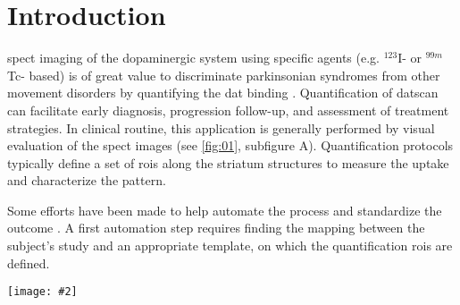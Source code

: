 \documentclass{frontiers}
\newcommand{\insertgraphic}[2]{\texttt{[image: \#2]}}
\newcommand{\fixme}[1]{}
\newcommand{\fixme}[1]{{\color{red}{\bf FIXME: }\emph{#1}}}
\newcommand{\insertgraphic}[2]{\texttt{[image: \#2]}}
\begin{document}

\glsresetall[\acronymtype]

\section{Introduction}
\label{sec:intro}
\fixme{Three sentences here introducing why the evaluation workflows
  are important and why python is good to build them (right?)}

\Gls*{spect} imaging of the dopaminergic system using
  specific agents (e.g. $^{123}$I- or $^{99m}$Tc- based) is of great
  value to discriminate parkinsonian syndromes from other movement
  disorders by quantifying the \acrlong*{dat} binding \citep{bajaj_clinical_2013}.
Quantification of \gls*{datscan} can facilitate early 
  diagnosis, progression follow-up, and assessment of treatment
  strategies. In clinical routine, this application is generally
  performed by visual evaluation of the \gls*{spect} images
  (see \autoref{fig:01}, subfigure A).
Quantification protocols typically define a set of \glspl*{roi} along the
  striatum structures to measure the uptake and characterize the pattern.

Some efforts have been made to help automate the process and standardize
  the outcome \citep{calvini_basal_2007,badiavas_spect_2011}.
A first automation step requires finding the mapping between the subject's
  study and an appropriate template, on which the quantification \glspl*{roi}
  are defined.

\begin{figure*}[ht]
\insertgraphic{width=1.0\linewidth}{figures/01-ProblemStatement}
\caption{\label{fig:01} \textbf{Problem statement.} 
On the left panel, A sub-figures show the standard classification by 
  the progression state of Parkinson's Disease: 
  A0 (normal), A1 (grade 1), A2 (grade 2), and A3 (grade 3). 
  (reproduced from \cite{center_for_drug_evaluation_and_research_fda_2011}).
On the right panel, B0 is a close-up of the template to which the subjects are registered, B1 depicts 
  one pathologic subject (grade 1) for which a corresponding \gls*{mri} scan was available, 
  and B2 is the resulting template non-linearly mapped onto subject's space using a standard 
  image registration procedure.
Finally, C shows the \gls*{mri} scan corresponding to B1.
In blue color, the contour of \glspl*{roi} of caudate and putamen structures.
In yellow, the corresponding contours from the template projected into the subject's space through 
  the deformation field obtained with non-linear registration, showing the problematic matching
  or the underlying anatomy.
}
\end{figure*}
\end{document}
